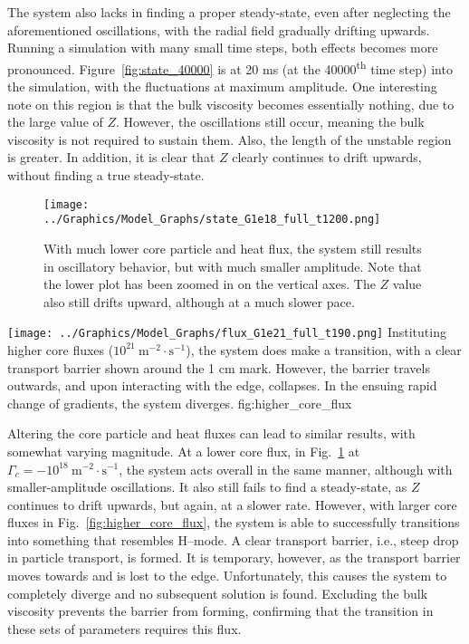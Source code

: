 The system also lacks in finding a proper steady-state, even after neglecting the aforementioned oscillations, with the radial field gradually drifting upwards.
Running a simulation with many small time steps, both effects becomes more pronounced.
Figure~\ref{fig:state_40000} is at 20 ms (at the 40000\textsuperscript{th} time step) into the simulation, with the fluctuations at maximum amplitude.
One interesting note on this region is that the bulk viscosity becomes essentially nothing, due to the large value of $Z$.
However, the oscillations still occur, meaning the bulk viscosity is not required to sustain them.
Also, the length of the unstable region is greater.
In addition, it is clear that $Z$ clearly continues to drift upwards, without finding a true steady-state.
\begin{figure}[hbt] %
\begin{minipage}{0.49\linewidth}
	\centering
	\texttt{[image: ../Graphics/Model\_Graphs/state\_G1e18\_full\_t1200.png]}
\end{minipage}
\hfill
\begin{minipage}{0.49\linewidth}
	\caption{With much lower core particle and heat flux, the system still results in oscillatory behavior, but with much smaller amplitude.
	Note that the lower plot has been zoomed in on the vertical axes.
	The $Z$ value also still drifts upward, although at a much slower pace.}
	\label{fig:lower_core_flux}
\end{minipage}
\end{figure}

	{\texttt{[image: ../Graphics/Model\_Graphs/flux\_G1e21\_full\_t190.png]}}
	{Instituting higher core fluxes ($10^{21}~\text{m}^{-2}\cdot\text{s}^{-1}$), the system does make a transition, with a clear transport barrier shown around the 1 cm mark.
	However, the barrier travels outwards, and upon interacting with the edge, collapses.
	In the ensuing rapid change of gradients, the system diverges.}
	{fig:higher_core_flux}

Altering the core particle and heat fluxes can lead to similar results, with somewhat varying magnitude.
At a lower core flux, in Fig.~\ref{fig:lower_core_flux} at $\Gamma_c = -10^{18}~\text{m}^{-2}\cdot\text{s}^{-1}$, the system acts overall in the same manner, although with smaller-amplitude oscillations.
It also still fails to find a steady-state, as $Z$ continues to drift upwards, but again, at a slower rate.
However, with larger core fluxes in Fig.~\ref{fig:higher_core_flux}, the system is able to successfully transitions into something that resembles H--mode.
A clear transport barrier, i.e., steep drop in particle transport, is formed.
It is temporary, however, as the transport barrier moves towards and is lost to the edge.
Unfortunately, this causes the system to completely diverge and no subsequent solution is found.
Excluding the bulk viscosity prevents the barrier from forming, confirming that the transition in these sets of parameters requires this flux.

